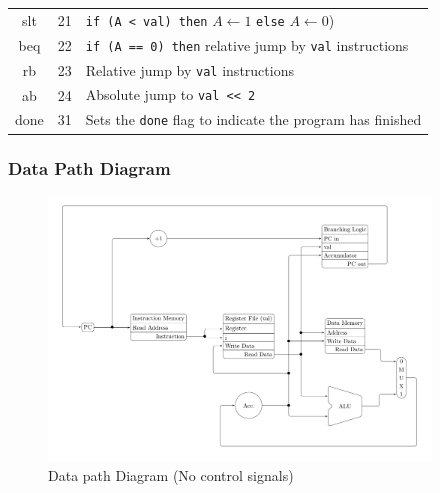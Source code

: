 \begin{frame}[fragile]
\begin{table}[]
\begin{tabular}{|c|c|l|}
				slt & 21 & \texttt{if (A < val) then} $A \leftarrow 1$ \texttt{else} $A \leftarrow 0$) \\
				beq & 22 & \texttt{if (A == 0) then} relative jump by \texttt{val} instructions\\
				rb & 23 & Relative jump by \texttt{val} instructions \\
				ab & 24 & Absolute jump to \texttt{val << 2} \\ \hline
				done & 31 & Sets the \verb|done| flag to indicate the program has finished \\
				\hline
			\end{tabular}
		\end{table}
	\end{frame}


	\begin{frame}
		\frametitle{Data Path Diagram}

		\begin{figure}[h]
			\includegraphics[height=7cm]{data-path-diagram}
			\caption{Data path Diagram (No control signals)}
		\end{figure}
	\end{frame}


